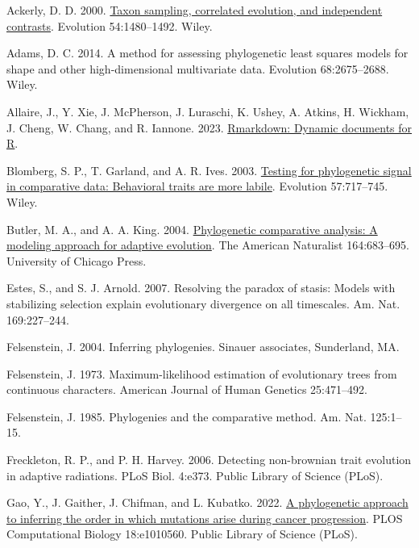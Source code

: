\documentclass[fleqn,10pt,lineno]{wlpeerj} %
\newlength{\cslhangindent}
\newenvironment{CSLReferences}[2] %
 {\begin{list}{}{%
  \setlength{\itemindent}{0pt}
  \setlength{\leftmargin}{0pt}
  \setlength{\parsep}{0pt}
  \ifodd #1
   \setlength{\leftmargin}{\cslhangindent}
   \setlength{\itemindent}{-1\cslhangindent}
  \fi
  \setlength{\itemsep}{#2\baselineskip}}}
 {\end{list}}
\begin{document}
\label{refs}
\begin{CSLReferences}{1}{0}
Ackerly, D. D. 2000. \href{https://doi.org/10.1111/j.0014-3820.2000.tb00694.x}{Taxon sampling, correlated evolution, and independent contrasts}. Evolution 54:1480--1492. Wiley.

Adams, D. C. 2014. A method for assessing phylogenetic least squares models for shape and other high-dimensional multivariate data. Evolution 68:2675--2688. Wiley.

Allaire, J., Y. Xie, J. McPherson, J. Luraschi, K. Ushey, A. Atkins, H. Wickham, J. Cheng, W. Chang, and R. Iannone. 2023. \href{https://github.com/rstudio/rmarkdown}{{R}markdown: Dynamic documents for {R}}.

Blomberg, S. P., T. Garland, and A. R. Ives. 2003. \href{https://doi.org/10.1111/j.0014-3820.2003.tb00285.x}{Testing for phylogenetic signal in comparative data: Behavioral traits are more labile}. Evolution 57:717--745. Wiley.

Butler, M. A., and A. A. King. 2004. \href{https://doi.org/10.1086/426002}{Phylogenetic comparative analysis: A modeling approach for adaptive evolution}. The American Naturalist 164:683--695. University of Chicago Press.

Estes, S., and S. J. Arnold. 2007. Resolving the paradox of stasis: Models with stabilizing selection explain evolutionary divergence on all timescales. Am. Nat. 169:227--244.

Felsenstein, J. 2004. Inferring phylogenies. Sinauer associates, Sunderland, MA.

Felsenstein, J. 1973. Maximum-likelihood estimation of evolutionary trees from continuous characters. American Journal of Human Genetics 25:471--492.

Felsenstein, J. 1985. Phylogenies and the comparative method. Am. Nat. 125:1--15.

Freckleton, R. P., and P. H. Harvey. 2006. Detecting non-brownian trait evolution in adaptive radiations. PLoS Biol. 4:e373. Public Library of Science (PLoS).

Gao, Y., J. Gaither, J. Chifman, and L. Kubatko. 2022. \href{https://doi.org/10.1371/journal.pcbi.1010560}{A phylogenetic approach to inferring the order in which mutations arise during cancer progression}. PLOS Computational Biology 18:e1010560. Public Library of Science (PLoS).


\end{CSLReferences}
\end{document}
